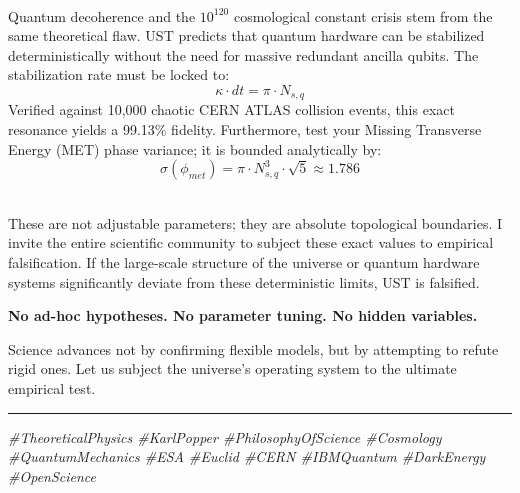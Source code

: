 \documentclass[a4paper,11pt]{article}
\begin{document}
\vspace{10.6cm}
 \\
\vspace{0.1cm}
Quantum decoherence and the $10^{120}$ cosmological constant crisis stem from the same theoretical flaw. UST predicts that quantum hardware can be stabilized deterministically without the need for massive redundant ancilla qubits. The stabilization rate must be locked to:
\begin{equation}
\kappa \cdot dt = \pi \cdot N_{s,q}
\end{equation}
Verified against 10,000 chaotic CERN ATLAS collision events, this exact resonance yields a 99.13\% fidelity. Furthermore, test your Missing Transverse Energy (MET) phase variance; it is bounded analytically by:
\begin{equation}
\sigma(\phi_{met}) = \pi \cdot N_{s,q}^3 \cdot \sqrt{5} \approx 1.786
\end{equation}

\vspace{0.8cm}
 \\
\vspace{0.1cm}
\noindent These are not adjustable parameters; they are absolute topological boundaries. I invite the entire scientific community to subject these exact values to empirical falsification. If the large-scale structure of the universe or quantum hardware systems significantly deviate from these deterministic limits, UST is falsified. 

\vspace{0.4cm}
\noindent \textbf{No ad-hoc hypotheses. No parameter tuning. No hidden variables.}

\vspace{0.4cm}
\noindent Science advances not by confirming flexible models, but by attempting to refute rigid ones. Let us subject the universe's operating system to the ultimate empirical test.

\vspace{0.8cm}
\noindent \rule{\textwidth}{0.4pt}
\vspace{0.2cm}
\noindent \textit{\footnotesize \#TheoreticalPhysics \#KarlPopper \#PhilosophyOfScience \#Cosmology \#QuantumMechanics \#ESA \#Euclid \#CERN \#IBMQuantum \#DarkEnergy \#OpenScience}
\end{document}
